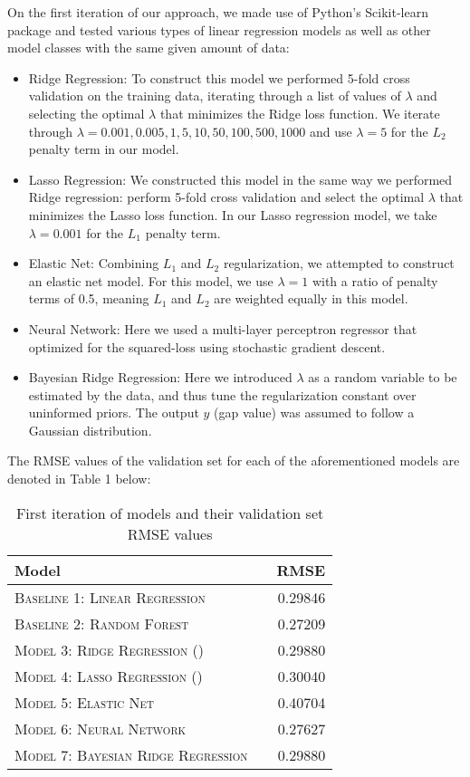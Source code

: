 \documentclass[11pt]{article}
\begin{document}
  On the first iteration of our approach, we made use of Python's Scikit-learn package and tested various types of linear regression models as well as other model classes with the same given amount of data:
  \begin{itemize}
      \item Ridge Regression: To construct this model we performed 5-fold cross validation on the training data, iterating through a list of values of $\lambda$ and selecting the optimal $\lambda$ that minimizes the Ridge loss function. We iterate through $\lambda = 0.001, 0.005, 1, 5, 10, 50, 100, 500, 1000$ and use $\lambda = 5$ for the $L_2$ penalty term in our model.
      \item Lasso Regression: We constructed this model in the same way we performed Ridge regression: perform 5-fold cross validation and select the optimal $\lambda$ that minimizes the Lasso loss function. In our Lasso regression model, we take $\lambda = 0.001$ for the $L_1$ penalty term.
      \item Elastic Net: Combining $L_1$ and $L_2$ regularization, we attempted to construct an elastic net model. For this model, we use $\lambda = 1$ with a ratio of penalty terms of 0.5, meaning $L_1$ and $L_2$ are weighted equally in this model. 
      \item Neural Network: Here we used a multi-layer perceptron regressor that optimized for the squared-loss using stochastic gradient descent.
      \item Bayesian Ridge Regression: Here we introduced $\lambda$ as a random variable to be estimated by the data, and thus tune the regularization constant over uninformed priors. The output $y$ (gap value) was assumed to follow a Gaussian distribution.
  \end{itemize}
  \newpage
  The RMSE values of the validation set for each of the aforementioned models are denoted in Table 1 below:
    \begin{table}[h!]
    \centering
    \begin{tabular}{llr}
     \toprule
     Model &  & RMSE \\
     \midrule
     \textsc{Baseline 1: Linear Regression} & & 0.29846 \\
     \textsc{Baseline 2: Random Forest} & & 0.27209 \\
     \textsc{Model 3: Ridge Regression} (\lambda=5) & & 0.29880 \\
     \textsc{Model 4: Lasso Regression} (\lambda=0.001) & & 0.30040 \\
     \textsc{Model 5: Elastic Net} & & 0.40704 \\
     \textsc{Model 6: Neural Network} & & 0.27627 \\
     \textsc{Model 7: Bayesian Ridge Regression} & & 0.29880 \\
     \bottomrule
    \end{tabular}
    \caption{\label{tab:results} First iteration of models and their validation set RMSE values}
    \end{table}
    
\end{document}
